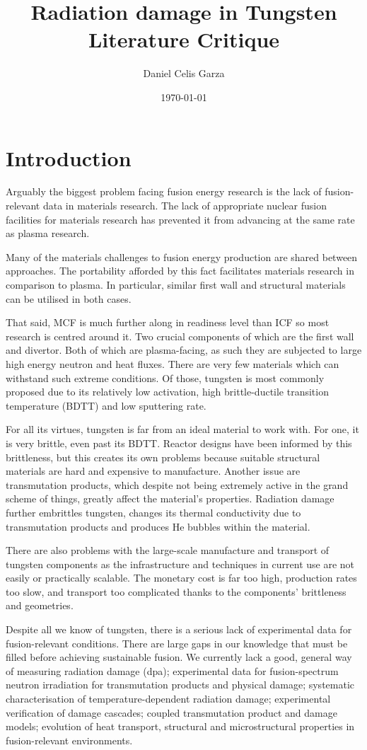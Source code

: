 \documentclass[12pt, a4paper]{article}
\title{Radiation damage in Tungsten Literature Critique}
\author{Daniel Celis Garza}
\date{\today}
\begin{document}
	\maketitle
	\section{Introduction}\label{s:intro}
		Arguably the biggest problem facing fusion energy research is the lack of fusion-relevant data in materials research. The lack of appropriate nuclear fusion facilities for materials research has prevented it from advancing at the same rate as plasma research.
		
		Many of the materials challenges to fusion energy production are shared between approaches. The portability afforded by this fact facilitates materials research in comparison to plasma. In particular, similar first wall and structural materials can be utilised in both cases.
		
		That said, MCF is much further along in readiness level than ICF so most research is centred around it. Two crucial components of which are the first wall and divertor. Both of which are plasma-facing, as such they are subjected to large high energy neutron and heat fluxes. There are very few materials which can withstand such extreme conditions. Of those, tungsten is most commonly proposed due to its relatively low activation, high brittle-ductile transition temperature (BDTT) and low sputtering rate.
		
		For all its virtues, tungsten is far from an ideal material to work with. For one, it is very brittle, even past its BDTT. Reactor designs have been informed by this brittleness, but this creates its own problems because suitable structural materials are hard and expensive to manufacture. Another issue are transmutation products, which despite not being extremely active in the grand scheme of things, greatly affect the material's properties. Radiation damage further embrittles tungsten, changes its thermal conductivity due to transmutation products and produces He bubbles within the material. 
		
		There are also problems with the large-scale manufacture and transport of tungsten components as the infrastructure and techniques in current use are not easily or practically scalable. The monetary cost is far too high, production rates too slow, and transport too complicated thanks to the components' brittleness and geometries.
		
		Despite all we know of tungsten, there is a serious lack of experimental data for fusion-relevant conditions. There are large gaps in our knowledge that must be filled before achieving sustainable fusion. We currently lack a good, general way of measuring radiation damage (dpa); experimental data for fusion-spectrum neutron irradiation for transmutation products and physical damage; systematic characterisation of temperature-dependent radiation damage; experimental verification of damage cascades; coupled transmutation product and damage models; evolution of heat transport, structural and microstructural properties in fusion-relevant environments.
		
\end{document}
